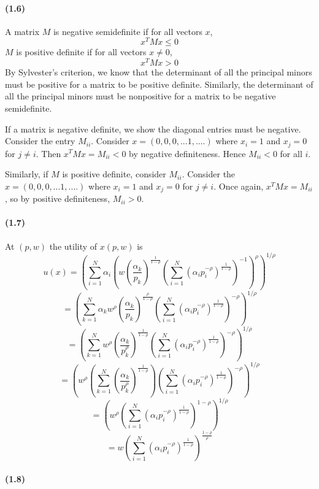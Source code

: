 \documentclass[10pt,letter]{article}
\begin{document}
\paragraph{(1.6)}
A matrix $M$ is negative semidefinite if for all vectors $x$,
\[ x^TMx \le 0 \]
$M$ is positive definite if for all vectors $x \neq 0$,
\[ x^T M x > 0 \]
By Sylvester's criterion, we know that the determinant of all the principal minors must be positive for a matrix to be positive definite. Similarly, the determinant of all the principal minors must be nonpositive for a matrix to be negative semidefinite.

If a matrix is negative definite, we show the diagonal entries must be negative. Consider the entry $M_{ii}$. Consider $x = (0, 0, 0, ... 1, ....)$ where $x_i = 1$ and $x_{j} = 0$ for $j \neq i$. Then $x^T M x = M_{ii} < 0$ by negative definiteness. Hence $M_{ii} < 0$ for all $i$.

Similarly, if $M$ is positive definite, consider $M_{ii}$. Consider the $x = (0, 0, 0, ... 1, ....)$ where $x_i = 1$ and $x_{j} = 0$ for $j \neq i$. Once again, $x^T M x = M_{ii}$, so by positive definiteness, $M_{ii} > 0$.
\paragraph{(1.7)}
At $(p,w)$ the utility of $x(p,w)$ is
\[ u(x) = \left( \sum_{i=1}^N \alpha_i \left(w \left(\frac{\alpha_k}{p_k}\right)^{\frac{1}{1-\rho}}\left(\sum_{i=1}^N \left(\alpha_i p_i^{-\rho }\right)^{\frac{1}{1-\rho}} \right)^{-1}\right)^\rho \right)^{1/\rho} \]
\[ = \left( \sum_{k=1}^N \alpha_kw^\rho \left(\frac{\alpha_k}{p_k}\right)^{\frac{\rho}{1-\rho}}\left(\sum_{i=1}^N \left(\alpha_i p_i^{-\rho }\right)^{\frac{1}{1-\rho}} \right)^{-\rho} \right)^{1/\rho} \]
\[ = \left( \sum_{k=1}^N w^\rho \left(\frac{\alpha_k}{p_k^\rho}\right)^{\frac{1}{1-\rho}}\left(\sum_{i=1}^N \left(\alpha_i p_i^{-\rho }\right)^{\frac{1}{1-\rho}} \right)^{-\rho} \right)^{1/\rho} \]
\[ = \left( w^\rho \left( \sum_{k=1}^N  \left(\frac{\alpha_k}{p_k^\rho}\right)^{\frac{1}{1-\rho}} \right)\left(\sum_{i=1}^N \left(\alpha_i p_i^{-\rho }\right)^{\frac{1}{1-\rho}} \right)^{-\rho} \right)^{1/\rho} \]
\[ = \left( w^\rho \left(\sum_{i=1}^N \left(\alpha_i p_i^{-\rho }\right)^{\frac{1}{1-\rho}} \right)^{1-\rho} \right)^{1/\rho} \]
\[ = w \left( \sum_{i=1}^N \left(\alpha_i p_i^{-\rho }\right)^{\frac{1}{1-\rho}} \right)^{\frac{1-\rho}{\rho}}  \]
\paragraph{(1.8)}
\end{document}
